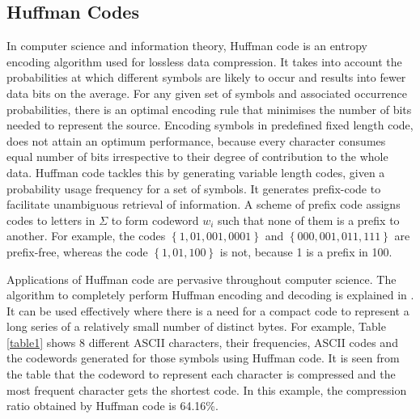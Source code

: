 \documentclass[preprint,12pt]{elsarticle}
\begin{document}
\subsection{Huffman Codes}
In computer science and information theory, Huffman code is an entropy encoding algorithm used for lossless data compression. It takes into account the probabilities at which different symbols are likely to occur and results into fewer data bits on the average. 
For any given set of symbols and associated occurrence probabilities, there is an optimal encoding rule that minimises the number of bits needed to represent the source. Encoding symbols in predefined fixed length code, does not attain an optimum performance, because every character consumes equal number of bits irrespective to their degree of contribution to the whole data. Huffman code tackles this by generating variable length codes, given a probability usage frequency for a set of symbols. It generates prefix-code to facilitate unambiguous retrieval of information. A scheme of prefix code assigns codes to letters in $\Sigma$ to form codeword $w_i$ such that none of them is a prefix to another. For example, the codes $\left\{ 1,01,001,0001\right\}$ and $\left\{ 000,001,011,111\right\}$ are prefix-free, whereas the code $\left\{ 1,01,100\right\}$ is not, because 1 is a prefix in 100.

Applications of Huffman code are pervasive throughout
computer science. The algorithm to completely perform Huffman encoding and decoding is explained in \cite{Amst86}. It can be used effectively where there is a need for a compact code to represent a long series of a relatively small number of distinct bytes. For example, Table \ref{table1} shows 8 different ASCII characters, their frequencies, ASCII codes and the codewords generated for those symbols using Huffman code. It is seen from the table that the codeword to represent each character is compressed and the most frequent character gets the shortest code. In this example, the compression ratio obtained by Huffman code is 64.16\%.   
\end{document}
